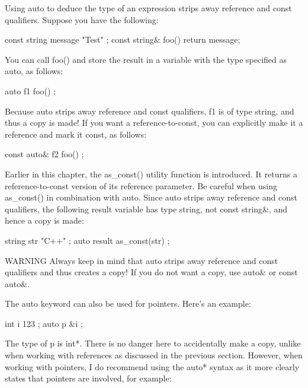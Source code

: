 Using auto to deduce the type of an expression strips away reference and const qualifiers. Suppose you have the following:

\begin{cpp}
const string message { "Test" };
const string& foo() { return message; }
\end{cpp}

You can call foo() and store the result in a variable with the type specified as auto, as follows:

\begin{cpp}
auto f1 { foo() };
\end{cpp}

Because auto strips away reference and const qualifiers, f1 is of type string, and thus a copy is made! If you want a reference-to-const, you can explicitly make it a reference and mark it const, as follows:

\begin{cpp}
const auto& f2 { foo() };
\end{cpp}

Earlier in this chapter, the as\_const() utility function is introduced. It returns a reference-to-const version of its reference parameter. Be careful when using as\_const() in combination with auto. Since auto strips away reference and const qualifiers, the following result variable has type string, not const string\&, and hence a copy is made:

\begin{cpp}
string str { "C++" };
auto result { as_const(str) };
\end{cpp}

\begin{myWarning}{WARNING}
Always keep in mind that auto strips away reference and const qualifiers and thus creates a copy! If you do not want a copy, use auto\& or const auto\&.
\end{myWarning}


The auto keyword can also be used for pointers. Here’s an example:

\begin{cpp}
int i { 123 };
auto p { &i };
\end{cpp}

The type of p is int*. There is no danger here to accidentally make a copy, unlike when working with references as discussed in the previous section. However, when working with pointers, I do recommend using the auto* syntax as it more clearly states that pointers are involved, for example:


